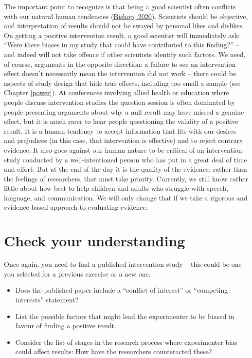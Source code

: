 \documentclass{krantz}
\begin{document}
The important point to recognize is that being a good scientist often conflicts with our natural human tendencies (\protect\hyperlink{ref-bishop2020}{Bishop, 2020}). Scientists should be objective, and interpretation of results should not be swayed by personal likes and dislikes. On getting a positive intervention result, a good scientist will immediately ask: ``Were there biases in my study that could have contributed to this finding?'' -- and indeed will not take offence if other scientists identify such factors. We need, of course, arguments in the opposite direction: a failure to see an intervention effect doesn't necessarily mean the intervention did not work -- there could be aspects of study design that hide true effects, including too small a sample (see Chapter \ref{power}). At conferences involving allied health or education where people discuss intervention studies the question session is often dominated by people presenting arguments about why a null result may have missed a genuine effect, but it is much rarer to hear people questioning the validity of a positive result. It is a human tendency to accept information that fits with our desires and prejudices (in this case, that intervention is effective) and to reject contrary evidence. It also goes against our human nature to be critical of an intervention study conducted by a well-intentioned person who has put in a great deal of time and effort. But at the end of the day it is the quality of the evidence, rather than the feelings of researchers, that must take priority. Currently, we still know rather little about how best to help children and adults who struggle with speech, language, and communication. We will only change that if we take a rigorous and evidence-based approach to evaluating evidence.

\hypertarget{check-your-understanding-7}{%
\section{Check your understanding}\label{check-your-understanding-7}}

Once again, you need to find a published intervention study -- this could be one you selected for a previous exercise or a new one.

\begin{itemize}
\item
  Does the published paper include a ``conflict of interest'' or ``competing interests'' statement?
\item
  List the possible factors that might lead the experimenter to be biased in favour of finding a positive result.
\item
  Consider the list of stages in the research process where experimenter bias could affect results: How have the researchers counteracted these?
\end{itemize}
\end{document}

